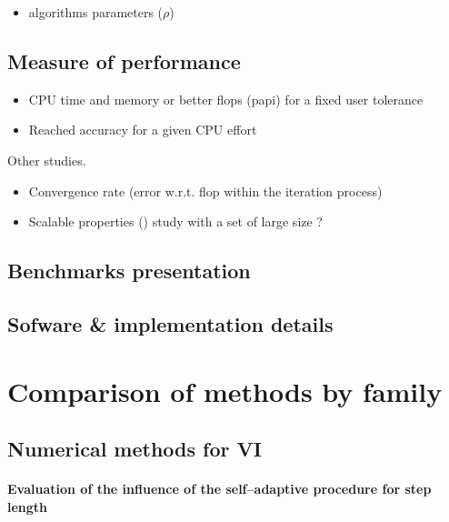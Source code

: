 \begin{itemize}
\item algorithms parameters ($\rho$)
\end{itemize}


\subsection{Measure of performance}
\begin{itemize}
\item CPU time and memory or better flops (papi) for a fixed user tolerance
\item Reached accuracy for a given CPU effort
\end{itemize}
Other studies.
\begin{itemize}
\item Convergence rate (error w.r.t. flop within the iteration process)
\item Scalable properties () study with a set of large size ?
\end{itemize}

\subsection{Benchmarks presentation}

\subsection{Sofware \& implementation details}
\clearpage


\section{Comparison of methods by family}

\subsection{Numerical methods for VI}


\def\widthfigure{0.6}
\paragraph{Evaluation of the influence of the self--adaptive procedure for step length}
\label{Sec:Comparison,VI,step-length}

